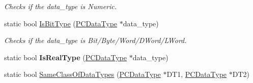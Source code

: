 \begin{DoxyCompactItemize}
\begin{DoxyCompactList}\small\item\em Checks if the data\+\_\+type is Numeric. \end{DoxyCompactList}\item 
static bool \hyperlink{classpc__emulator_1_1Utils_a8eaca0348e91221feedffd1b2772b3a6}{Is\+Bit\+Type} (\hyperlink{classpc__emulator_1_1PCDataType}{P\+C\+Data\+Type} $\ast$data\+\_\+type)\hypertarget{classpc__emulator_1_1Utils_a8eaca0348e91221feedffd1b2772b3a6}{}\label{classpc__emulator_1_1Utils_a8eaca0348e91221feedffd1b2772b3a6}

\begin{DoxyCompactList}\small\item\em Checks if the data\+\_\+type is Bit/\+Byte/\+Word/\+D\+Word/\+L\+Word. \end{DoxyCompactList}\item 
static bool {\bfseries Is\+Real\+Type} (\hyperlink{classpc__emulator_1_1PCDataType}{P\+C\+Data\+Type} $\ast$data\+\_\+type)\hypertarget{classpc__emulator_1_1Utils_a869b48efd6df5ed272d3c0914139ec2d}{}\label{classpc__emulator_1_1Utils_a869b48efd6df5ed272d3c0914139ec2d}

\item 
static bool \hyperlink{classpc__emulator_1_1Utils_a47bc7ad0d941b0256dd00fa21822c28c}{Same\+Class\+Of\+Data\+Types} (\hyperlink{classpc__emulator_1_1PCDataType}{P\+C\+Data\+Type} $\ast$D\+T1, \hyperlink{classpc__emulator_1_1PCDataType}{P\+C\+Data\+Type} $\ast$D\+T2)\hypertarget{classpc__emulator_1_1Utils_a47bc7ad0d941b0256dd00fa21822c28c}{}\label{classpc__emulator_1_1Utils_a47bc7ad0d941b0256dd00fa21822c28c}


\end{DoxyCompactItemize}
